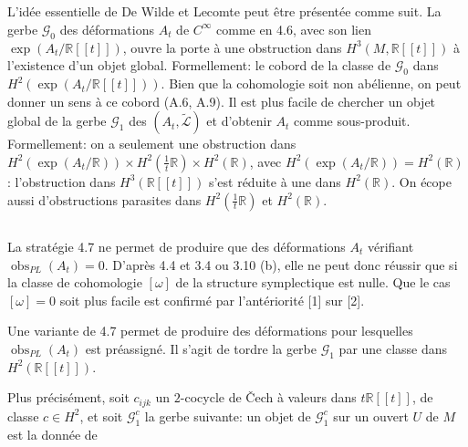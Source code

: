 \documentclass[11pt,a4paper]{article}
\theoremstyle{plain}
\theoremstyle{definition}
\DeclareMathOperator{\obs}{obs}
\newcommand{\R}{\mathbb{R}}
\begin{document}
\subsection{}
L'id\'ee essentielle de De Wilde et Lecomte peut \^etre pr\'esent\'ee comme suit.
La gerbe $\mathcal{G}_{0}$ des d\'eformations $A_{t}$ de $C^{\infty}$ comme en 4.6, avec son lien $\exp(A_{t}/\R[[t]])$,
ouvre la porte \`a une obstruction dans $H^{3}(M, \R[[t]])$ \`a l'existence d'un objet global.
Formellement: le cobord de la classe de $\mathcal{G}_{0}$ dans $H^{2}(\exp(A_{t}/\R[[t]]))$. Bien que la cohomologie soit non ab\'elienne, on peut donner un sens \`a ce cobord (A.6, A.9). Il est plus facile de chercher un objet global de la gerbe $\mathcal{G}_{1}$ des $(A_{t}, \widetilde{\mathcal{L}})$ et d'obtenir $A_{t}$ comme sous-produit. Formellement: on a seulement une obstruction dans $H^{2}(\exp(A_{t}/\R)) \times H^{2}(\tfrac{1}{t}\R) \times H^{2}(\R)$, avec $H^{2}(\exp(A_{t}/\R)) = H^{2}(\R)$: l'obstruction dans $H^{3}(\R[[t]])$ s'est r\'eduite \`a une dans $H^{2}(\R)$. On \'ecope aussi d'obstructions parasites dans $H^{2}(\tfrac{1}{t}\R)$ et $H^{2}(\R)$.

\subsection{}
La strat\'egie 4.7 ne permet de produire que des d\'eformations $A_{t}$ v\'erifiant $\obs_{PL}(A_{t}) = 0$. D'apr\`es 4.4 et 3.4 ou 3.10 (b), elle ne peut donc r\'eussir que si la classe de cohomologie $[\omega]$ de la structure symplectique est nulle. Que le cas $[\omega] = 0$
soit plus facile est confirm\'e par l'ant\'eriorit\'e [1] sur [2].

Une variante de 4.7 permet de produire des d\'eformations pour lesquelles $\obs_{PL}(A_{t})$ est pr\'eassign\'e. Il s'agit de tordre la gerbe $\mathcal{G}_{1}$ par une classe dans $H^{2}(\R[[t]])$.

Plus pr\'ecis\'ement, soit $c_{ijk}$ un $2$-cocycle de \v{C}ech \`a valeurs dans $t\R[[t]]$, de classe $c \in H^{2}$, et soit $\mathcal{G}_{1}^{c}$ la gerbe suivante: un objet de $\mathcal{G}_{1}^{c}$ sur un ouvert $U$ de $M$ est la donn\'ee de
\end{document}
